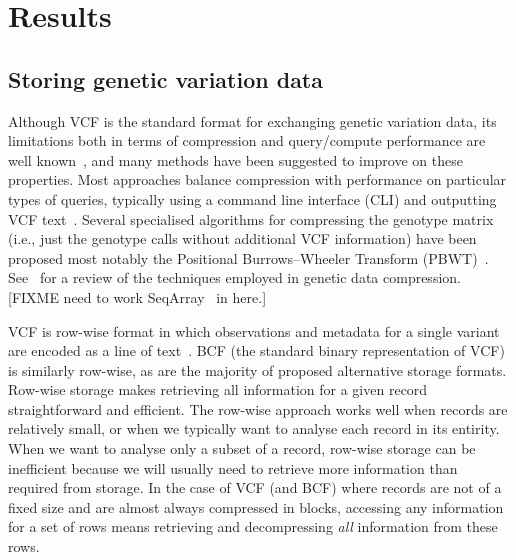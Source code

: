 \documentclass[a4paper,num-refs]{oup-contemporary}
\begin{document}
\section{Results}

\subsection{Storing genetic variation data}
Although VCF is the standard format for exchanging genetic variation
data, its limitations both in terms of compression 
and query/compute performance are well 
known~\citep[e.g.][]{kelleher2013processing,layer2016efficient,li2016bgt},
and many methods 
have been suggested to improve on these properties.
Most approaches balance compression with
performance on particular types of queries, 
typically using a command line interface (CLI)
and outputting VCF text~\citep{
layer2016efficient, %
li2016bgt, %
tatwawadi2016gtrac, %
danek2018gtc, %
lin2020sparse, %
lan2020genozip,lan2021genozip, %
lefaive2021sparse, %
wertenbroek2022xsi,%
zhang2023gbc}. %
Several specialised algorithms for compressing 
the genotype matrix (i.e., just the genotype calls without additional
VCF information) have been proposed
\citep{deorowicz2013genome, %
deorowicz2019gtshark, %
deorowicz2021vcfshark, %
dehaas2024genotype} %
most notably the Positional
Burrows--Wheeler Transform (PBWT)~\citep{durbin2014efficient}.
See~\citep{mcvean2019linkage} for a review of the techniques
employed in genetic data compression.
[FIXME need to work SeqArray~\citep{zheng2017seqarray,zheng2012high}
in here.]

VCF is row-wise format in which 
observations and metadata for a single variant are
encoded as a line of text~\citep{danecek2011variant}.
BCF (the standard binary representation of VCF) is similarly 
row-wise, as are the majority of proposed alternative storage formats.
Row-wise storage makes retrieving all information
for a given record straightforward and efficient. 
The row-wise approach works well when records are relatively small, 
or when we typically want to analyse each record in its entirity.
When we want to analyse only a subset of a record,
row-wise storage can be inefficient because we will usually need to
retrieve more information than required from storage. In the case 
of VCF (and BCF) where records are not of a fixed size and 
are almost always compressed in blocks, accessing any information
for a set of rows means retrieving and decompressing \emph{all} 
information from these rows.
\end{document}
